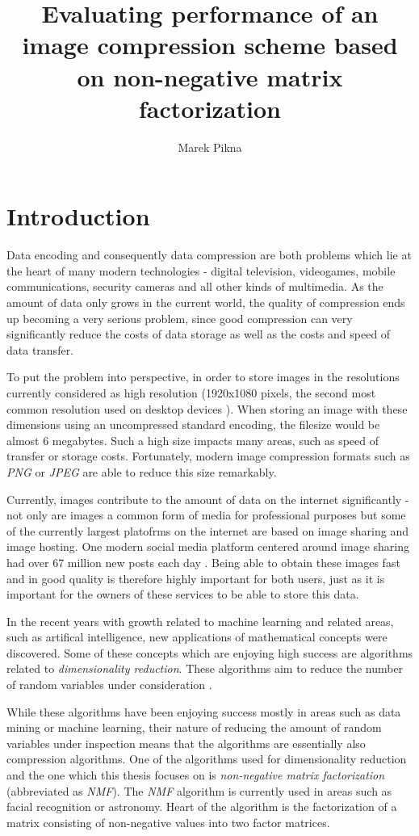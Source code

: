\documentclass[thesis=M,english]{FITthesis}[2012/10/20]
\title{Evaluating performance of an image compression scheme based on non-negative matrix factorization}
\author{Marek Pikna} %
\begin{document}

\chapter{Introduction}
Data encoding and consequently data compression are both problems which lie
at the heart of many modern technologies - digital television, videogames, mobile
communications, security cameras and all other kinds of multimedia. As the amount
of data only grows in the current world, the quality of
compression ends up becoming a very serious problem, since good compression can
very significantly reduce the costs of data storage as well as the costs and speed
of data transfer.

To put the problem into perspective, in order to store images in the resolutions
currently considered as high resolution (1920x1080 pixels, the second most common
resolution used on desktop devices \cite{res-stats}).
When storing an image with these dimensions using an uncompressed standard encoding,
the filesize would be almost 6 megabytes. Such a high size impacts many areas, such as
speed of transfer or storage costs. Fortunately, modern image compression formats such as
\emph{PNG} or \emph{JPEG} are able to reduce this size remarkably.

Currently, images contribute to the amount of data on the internet significantly - not only are images a common
form of media for professional purposes but some of the currently largest platofrms on the
internet are based on image sharing and image hosting. One modern social media platform centered around image
sharing had over 67 million new posts each day \cite{data-amount}.
Being able to obtain these images fast and in good quality is therefore highly important for both users, just
as it is important for the owners of these services to be able to store this data.

In the recent years with growth related to machine learning and related areas, such as artifical
intelligence, new applications of mathematical concepts were discovered. Some of these concepts
which are enjoying high success are algorithms related to \emph{dimensionality reduction}. These
algorithms aim to reduce the number of random variables under consideration \cite{dimens-reduction}.

While these algorithms have been enjoying success mostly in areas such as data mining or machine
learning, their nature of reducing the amount of random variables under inspection means that the
algorithms are essentially also compression algorithms. One of the algorithms used for dimensionality
reduction and the one which this thesis focuses on is \emph{non-negative matrix factorization} (abbreviated
as \emph{NMF}). The \emph{NMF} algorithm is currently used in areas such as facial recognition or
astronomy. Heart of the algorithm is the factorization of a matrix consisting of non-negative values into
two factor matrices.
\end{document}
